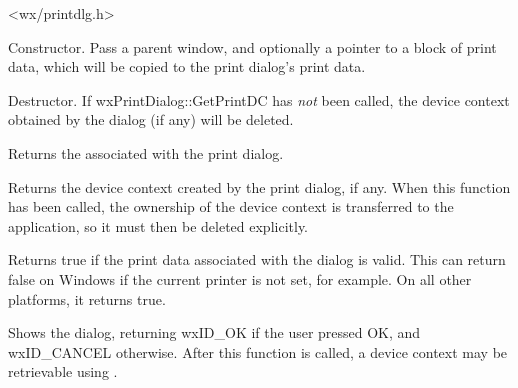 <wx/printdlg.h>






Constructor. Pass a parent window, and optionally a pointer to a block of print
data, which will be copied to the print dialog's print data.





Destructor. If wxPrintDialog::GetPrintDC has {\it not} been called,
the device context obtained by the dialog (if any) will be deleted.

\label{wxprintdialoggetprintdialogdata}


Returns the  associated with the print dialog.

\label{wxprintdialoggetprintdc}


Returns the device context created by the print dialog, if any.
When this function has been called, the ownership of the device context
is transferred to the application, so it must then be deleted
explicitly.

\label{wxprintdialogok}


Returns true if the print data associated with the dialog is valid.
This can return false on Windows if the current printer is not set, for example.
On all other platforms, it returns true.

\label{wxprintdialogshowmodal}


Shows the dialog, returning wxID\_OK if the user pressed OK, and wxID\_CANCEL
otherwise. After this function is called, a device context may
be retrievable using .

